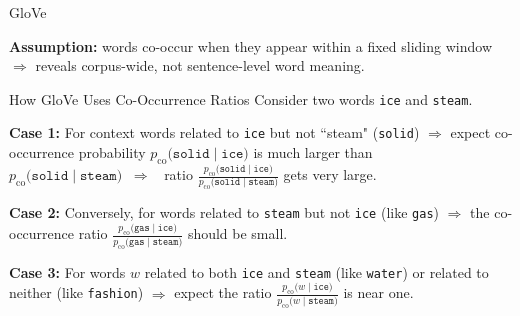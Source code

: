 \begin{frame}{GloVe}

\begin{itemizeSpaced}{0pt}
    \item \textbf{Assumption: } words co-occur when they appear within a fixed sliding window $\Rightarrow$ reveals corpus-wide, not sentence-level word meaning.
\end{itemizeSpaced}

\begin{exampleBlock}{How GloVe Uses Co-Occurrence Ratios \footnotemark}
Consider two words \texttt{ice} and \texttt{steam}. 

\begin{itemizeSpaced}{0pt}
    \item \textbf{Case 1:} For context words related to \texttt{ice} but not ``steam" (\texttt{solid}) $\Rightarrow$ expect co-occurrence probability $p_{\text{co}} \Big( \texttt{solid} \; | \; \texttt{ice} \Big)$ is much larger than $p_{\text{co}} \Big( \texttt{solid} \; | \; \texttt{steam} \Big)  \;\; \Rightarrow \;\; $ ratio $\frac {p_{\text{co}} \Big( \texttt{solid} \; | \; \texttt{ice} \Big)} {p_{\text{co}} \Big( \texttt{solid} \; | \; \texttt{steam} \Big)}$ gets very large.

    \item \textbf{Case 2: } Conversely, for words related to \texttt{steam} but not \texttt{ice} (like \texttt{gas}) $\Rightarrow$ the co-occurrence ratio $\frac {p_{\text{co}} \Big( \texttt{gas} \; | \; \texttt{ice} \Big)} {p_{\text{co}} \Big( \texttt{gas} \; | \; \texttt{steam} \Big)}$ should be small. 

    \item \textbf{Case 3:} For words $w$ related to both \texttt{ice} and \texttt{steam} (like \texttt{water}) or related to neither (like \texttt{fashion}) $\Rightarrow$ expect the ratio $\frac {p_{\text{co}} \Big( w \; | \; \texttt{ice} \Big)} {p_{\text{co}} \Big( w \; | \; \texttt{steam} \Big)}$ is near one. 
\end{itemizeSpaced}
\end{exampleBlock}




\end{frame}



